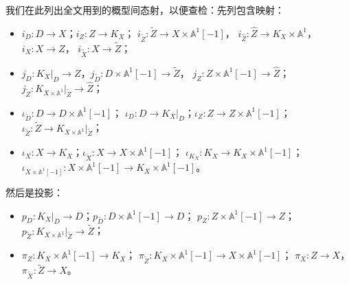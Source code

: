我们在此列出全文用到的概型间态射，以便查检：先列包含映射：
\begin{itemize}[leftmargin=2em,itemsep=0.25em]
\item $i_D\colon D\to X$；$i_Z\colon Z\to K_X$；
$i_{\tilde Z}\colon\tilde Z\to X\times\mathbb A^1[-1]$，
$i_{\hat Z}\colon\hat Z\to K_X\times\mathbb A^1$，$i_X\colon X\to Z$，
$i_{\tilde X}\colon X\to\tilde Z$；
\item $j_D\colon K_X|_D\to Z$，$j_{\tilde D}\colon D\times\mathbb A^1[-1]\to\tilde Z$，
$j_Z\colon Z\times\mathbb A^1[-1]\to\hat Z$；
$j_{\tilde Z}\colon K_{X\times\mathbb A^1}|_{\tilde Z}\to\hat Z$；
\item $\iota_{\tilde D}\colon D\to D\times\mathbb A^1[-1]$；
$\iota_D\colon D\to K_X|_D$；$\iota_Z\colon Z\to Z\times\mathbb A^1[-1]$；
$\iota_{\tilde Z}\colon\tilde Z\to K_{X\times\mathbb A^1}|_{\tilde Z}$；
\item $\iota_X\colon X\to K_X$；$\iota_{\tilde X}\colon X\to X\times\mathbb A^1[-1]$；
$\iota_{K_X}\colon K_X\to K_X\times\mathbb A^1[-1]$；
$\iota_{X\times\mathbb A^1[-1]}\colon X\times\mathbb A^1[-1]\to K_X\times\mathbb A^1[-1]$。
\end{itemize}
然后是投影：
\begin{itemize}[leftmargin=2em,itemsep=0.25em]
\item $p_D\colon K_X|_D\to D$；$p_{\tilde D}\colon D\times\mathbb A^1[-1]\to D$；
$p_Z\colon Z\times\mathbb A^1[-1]\to Z$；
$p_{\tilde Z}\colon K_{X\times\mathbb A^1}|_{\tilde Z}\to\tilde Z$；
\item $\pi_Z\colon K_X\times\mathbb A^1[-1]\to K_X$；
$\pi_{\tilde Z}\colon K_X\times\mathbb A^1[-1]\to X\times\mathbb A^1[-1]$；
$\pi_X\colon Z\to X$，$\pi_{\tilde X}\colon\tilde Z\to X$。
\end{itemize}




